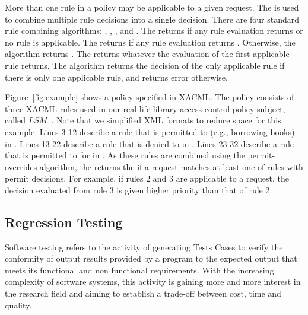 More than one rule in a policy may be applicable to a given request.
The  is used to combine multiple
rule decisions into a single decision. There are four standard rule
combining algorithms: , , , and . The
 returns  if any rule
evaluation returns  or no rule is applicable. The
 returns  if any
rule evaluation returns . Otherwise, the algorithm
returns .
The  returns whatever the
evaluation of the first applicable rule returns. The
 algorithm returns the decision of the only
applicable rule if there is only one applicable rule, and returns
error otherwise.

Figure~\ref{fig:example} shows a policy specified
in XACML. The policy consists of three XACML rules used in our real-life library access
control policy subject, called $LSM$~\cite{mouelhi09:tranforming}.
Note that we simplified XML formats to reduce
space for this example.
Lines 3-12 describe a rule that  is permitted to  (e.g., borrowing books)  in .
Lines 13-22 describe a rule that  is denied to   in .
Lines 23-32 describe a rule that  is permitted to  for  in .
As these rules are combined using the permit-overrides algorithm, the  returns the  if
 a request matches at least one of rules with permit decisions. For example, if rules 2 and 3 are applicable to a request, the decision
evaluated from rule 3 is given higher priority than that of rule 2.


\subsection{Regression Testing}
Software testing \cite{Myers:1979:AST:539883} refers to the activity of generating Tests Cases to verify the conformity of output results provided by a 
program to the expected output that meets its functional and non functional requirements. With the increasing complexity of software systems, 
this activity is gaining more and more interest in the research field and aiming to establish a trade-off between cost, time and quality. 

